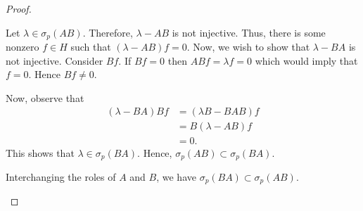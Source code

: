 \begin{proof}
\begin{enumerate}[label=(\roman*)]
	Let $\lambda \in \sigma _{p} \left( AB \right)$. Therefore, $\lambda - AB$ is not injective. Thus, there is some nonzero $f\in H$ such that $(\lambda - AB)f  = 0$. Now, we wish to show that $\lambda - BA$ is not injective. Consider $Bf$. If $Bf = 0$ then $ABf= \lambda f = 0$ which would imply that $f=0$. Hence $Bf \ne 0$.

	Now, observe that 
	\begin{align*}
	    \left( \lambda - BA \right)Bf &=  \left( \lambda B - BAB \right)f  \\
	    &= B \left( \lambda - AB \right)f \\
	    &= 0.
	\end{align*}
	This shows that $\lambda \in \sigma_{p} \left( BA \right)$.
	Hence, $\sigma_{p} \left( AB \right) \subset \sigma _{p} \left( BA \right)$.
	
	Interchanging the roles of $A$ and $B$, we have $\sigma _{p} \left( BA \right) \subset \sigma_{p} \left( AB \right)$.
\end{enumerate}
\end{proof}
